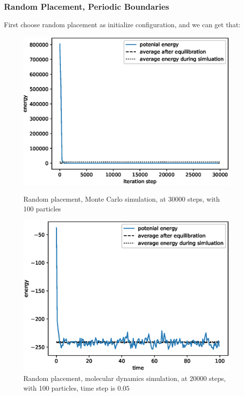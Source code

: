 \documentclass[UTF8,a4paper,no-math]{article}
\begin{document}
\subsubsection{Random Placement, Periodic Boundaries}
First choose random placement as initialize configuration, and we can get that:
\begin{figure}[H]
	\centering
	\begin{minipage}[t]{0.45\textwidth}
		\centering
		\includegraphics[height=0.2\textheight]{fig/plot_norand_30000_steps_100_particles_0.8442_rho_0.728_tempure_.eps}
		\caption{Random placement, Monte Carlo simulation, at 30000 steps, with 100 particles}
	\end{minipage}\hspace{0.5cm}
	\begin{minipage}[t]{0.45\textwidth}
		\centering
		\includegraphics[height=0.2\textheight]{fig/md_plot_20000_steps_100_particles_0.8442_rho_0.728_tempure_.eps}
		\caption{Random placement, molecular dynamics simulation, at 20000 steps, with 100 particles, time step is $0.05$}
	\end{minipage}
\end{figure}
\end{document}
